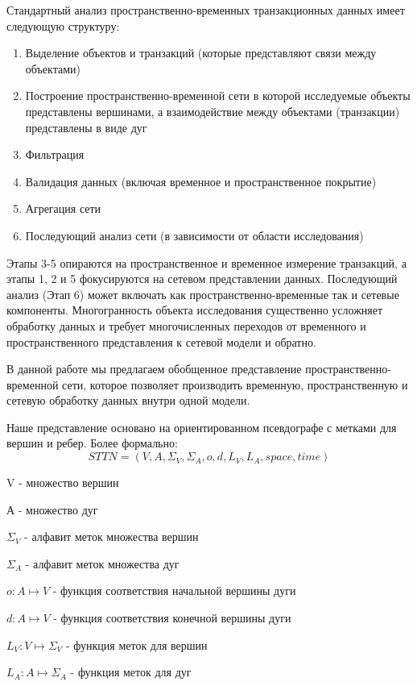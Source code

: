 Стандартный анализ пространственно-временных транзакционных данных имеет следующую структуру:
\begin{enumerate}
  \item Выделение объектов и транзакций (которые представляют связи между объектами)
  \item Построение пространственно-временной сети в которой исследуемые объекты представлены вершинами, а взаимодействие между объектами (транзакции) представлены в виде дуг
  \item Фильтрация
  \item Валидация данных (включая временное и пространственное покрытие)
  \item Агрегация сети 
  \item Последующий анализ сети (в зависимости от области исследования)
\end{enumerate}

Этапы 3-5 опираются на пространственное и временное измерение транзакций, а этапы 1, 2 и 5 фокусируются на сетевом представлении данных. Последующий анализ (Этап 6) может включать как пространственно-временные так и сетевые компоненты. Многогранность объекта исследования существенно усложняет обработку данных и требует многочисленных переходов от временного и пространственного представления к сетевой модели и обратно. 

В данной работе мы предлагаем обобщенное представление пространственно-временной сети, которое позволяет производить временную, пространственную и сетевую обработку данных внутри одной модели.

Наше представление основано на ориентированном псевдографе с метками для вершин и ребер. Более формально: 
\begin{equation}
\label{eq:sttn} {
STTN = (V, A, \Sigma_V, \Sigma_A, o, d, L_V, L_A, space, time)
}
\end{equation}

V - множество вершин

А - множество дуг

$\Sigma_V$ - алфавит меток множества вершин

$\Sigma_A$ - алфавит меток множества дуг

$o: A \mapsto V$ - функция соответствия начальной вершины дуги

$d: A \mapsto V$ - функция соответствия конечной вершины дуги

$L_V: V \mapsto \Sigma_V$ - функция меток для вершин

$L_A: A \mapsto \Sigma_A$ - функция меток для дуг

